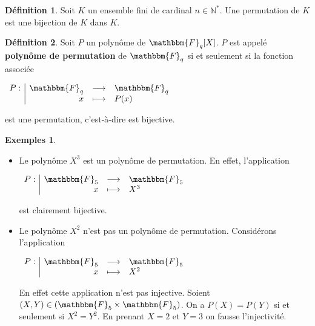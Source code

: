 \documentclass[12pt]{article}
\newcommand{\F}{\mathbbm{F}}
\theoremstyle{definition}
\newtheorem{definition}{Définition}
\newtheorem*{examples}{Exemples}
\begin{document}
\begin{definition}
Soit $K$ un ensemble fini de cardinal $n\in \mathbb{N}^*$. Une permutation de $K$ est une bijection de $K$ dans $K$.
\end{definition}
\pagebreak
\begin{definition}
Soit $P$ un polynôme de $\F_q [X]$. $P$ est appelé \textbf{polynôme de permutation} de $\F_q$ si et seulement si la fonction associée
\begin{center}
$
\begin{array}{l|rcl}
\displaystyle
P : & \F _q & \longrightarrow & \F _q \\
    & x & \longmapsto & P(x)
\end{array}
$
\end{center}
est une permutation, c'est-à-dire est bijective.
\end{definition}
\vspace{24pt}
\begin{examples}
	\begin{itemize}
On se place dans $\F_5$.\\
\item[1.] Le polynôme $X^3$ est un polynôme de permutation. En effet, l'application\\
\begin{center}
$
\begin{array}{l|rcl}
\displaystyle
P : & \F _5 & \longrightarrow & \F _5 \\
    & x & \longmapsto & X^3
\end{array}
$
\end{center}
\vspace{10pt}
est clairement bijective.\\
\item[2.] Le polynôme $X^2$ n'est pas un polynôme de permutation. Considérons l'application \\
\begin{center}
$
\begin{array}{l|rcl}
\displaystyle
P : & \F _5 & \longrightarrow & \F _5 \\
    & x & \longmapsto & X^2
\end{array}
$
\end{center}
\vspace{12pt}
En effet cette application n'est pas injective. Soient $(X,Y) \in (\F_5 \times \F_5)$. On a $P(X)=P(Y)$ si et seulement si $X^2=Y^2$. En prenant $X=2$ et $Y=3$ on fausse l'injectivité.
	\end{itemize}
\end{examples}
\end{document}
